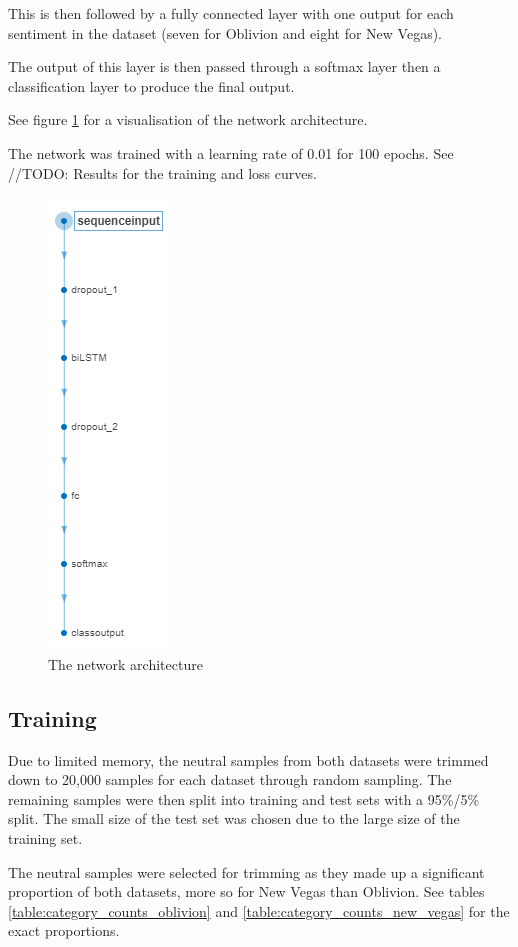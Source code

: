 \documentclass[journal]{IEEEtran}
\begin{document}
This is then followed by a fully connected layer with one output for each
sentiment in the dataset (seven for Oblivion and eight for New Vegas).

The output of this layer is then passed through a softmax layer then a classification layer
to produce the final output.

See figure \ref{fig:network} for a visualisation of the network architecture.

The network was trained with a learning rate of 0.01 for 100 epochs. See //TODO: Results for the training and loss curves.

\begin{figure}
    \includegraphics{network.png}
    \caption{The network architecture}
    \label{fig:network}
\end{figure}

\subsection{Training}
Due to limited memory, the neutral samples from both datasets were trimmed down to 20,000
samples for each dataset through random sampling. The remaining samples were then split into training and test sets
with a 95\%/5\% split. The small size of the test set was chosen due to the large size of the training set.

The neutral samples were selected for trimming as they made up a significant proportion of both
datasets, more so for New Vegas than Oblivion. See tables \ref{table:category_counts_oblivion}
and \ref{table:category_counts_new_vegas} for the exact proportions.
\end{document}
